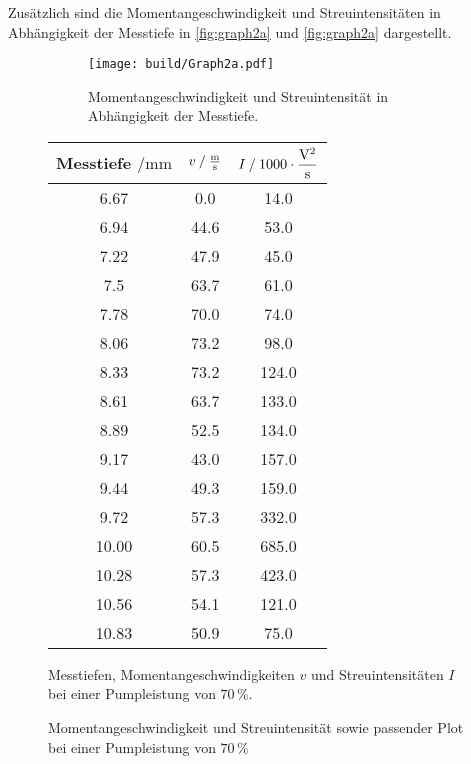 Zusätzlich sind die Momentangeschwindigkeit und Streuintensitäten in Abhängigkeit der Messtiefe in \autoref{fig:graph2a} und \autoref{fig:graph2a} dargestellt.

\begin{figure}[H]
    \begin{subfigure}{0.57\textwidth} 
        \centering
        \texttt{[image: build/Graph2a.pdf]} 
        \caption{Momentangeschwindigkeit und Streuintensität in Abhängigkeit der Messtiefe.}
        \label{fig:graph2a}
        \qquad
    \end{subfigure}
    \begin{subtable}{0.43\textwidth}
        \centering
       \begin{tabular}{c c c}
        \toprule 
        {Messtiefe $\mathbin{/} \unit{\milli\meter}$} & {$v \mathbin{/} \unit{\frac{\meter}{\second}} $} & {$I \mathbin{/} 1000 \cdot \unit{\dfrac{\volt^2}{\second}}$}  \\
        \midrule 
           6.67     &      0.0     &     14.0    \\
           6.94     &     44.6     &     53.0    \\
           7.22     &     47.9     &     45.0    \\
           7.5      &     63.7     &     61.0    \\
           7.78     &     70.0     &     74.0    \\
           8.06     &     73.2     &     98.0    \\
           8.33     &     73.2     &    124.0    \\
           8.61     &     63.7     &    133.0    \\
           8.89     &     52.5     &    134.0    \\
           9.17     &     43.0     &    157.0    \\
           9.44     &     49.3     &    159.0    \\
           9.72     &     57.3     &    332.0    \\
           10.00    &     60.5     &    685.0    \\
           10.28    &     57.3     &    423.0    \\
           10.56    &     54.1     &    121.0    \\
           10.83    &     50.9     &     75.0    \\
        \bottomrule
       \end{tabular}
       \caption{Messtiefen, Momentangeschwindigkeiten $v$ und Streuintensitäten $I$ bei einer Pumpleistung von $70 \,\%$.}
        \label{tab:2a}  
    \end{subtable}
    \caption{Momentangeschwindigkeit und Streuintensität sowie passender Plot bei einer Pumpleistung von $70 \,\%$} 
\end{figure}    


